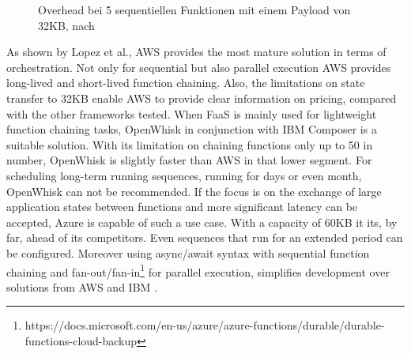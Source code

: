 \documentclass[a4paper,twoside,11pt, pagesize]{scrartcl}
\begin{document}
\begin{spacing}{1.2}
\begin{figure}[H]
\caption{Overhead bei 5 sequentiellen Funktionen mit einem Payload von 32KB, nach \cite{lopez2018comparison}}
\end{figure} 
As shown by Lopez et al., AWS provides the most mature solution in terms of orchestration. Not only for sequential but also parallel execution AWS provides long-lived and short-lived function chaining. Also, the limitations on state transfer to 32KB enable AWS to provide clear information on pricing, compared with the other frameworks tested. When FaaS is mainly used for lightweight function chaining tasks, OpenWhisk in conjunction with IBM Composer is a suitable solution. With its limitation on chaining functions only up to 50 in number, OpenWhisk is slightly faster than AWS in that lower segment. For scheduling long-term running sequences, running for days or even month, OpenWhisk can not be recommended. If the focus is on the exchange of large application states between functions and more significant latency can be accepted, Azure is capable of such a use case. With a capacity of 60KB it its, by far, ahead of its competitors. Even sequences that run for an extended period can be configured. Moreover using async/await syntax with sequential function chaining and fan-out/fan-in\footnote{https://docs.microsoft.com/en-us/azure/azure-functions/durable/durable-functions-cloud-backup} for parallel execution, simplifies development over solutions from AWS and IBM \cite{lopez2018comparison}.

\end{spacing}
\end{document}
